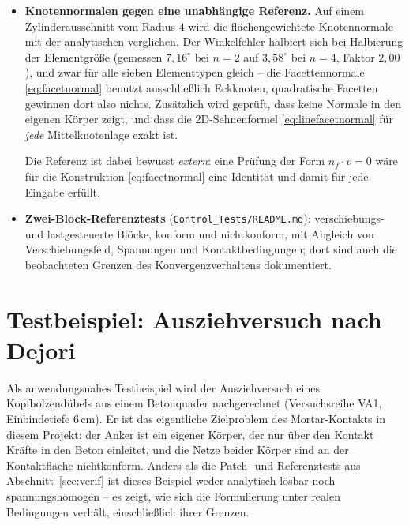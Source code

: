 \documentclass[a4paper,11pt]{article}
\def\bm#1{#1}%
\newcommand{\file}[1]{\texttt{\small #1}}
\let\stdsection\section
\renewcommand{\section}{\clearpage\stdsection}
\begin{document}
\begin{itemize}
  \item \textbf{Knotennormalen gegen eine unabhängige Referenz.} Auf einem Zylinderausschnitt
        vom Radius $4$ wird die flächengewichtete Knotennormale mit der analytischen verglichen.
        Der Winkelfehler halbiert sich bei Halbierung der Elementgröße (gemessen $7{,}16^\circ$
        bei $n=2$ auf $3{,}58^\circ$ bei $n=4$, Faktor $2{,}00$), und zwar für alle sieben
        Elementtypen gleich -- die Facettennormale \eqref{eq:facetnormal} benutzt ausschließlich
        Eckknoten, quadratische Facetten gewinnen dort also nichts. Zusätzlich wird geprüft, dass
        keine Normale in den eigenen Körper zeigt, und dass die 2D-Sehnenformel
        \eqref{eq:linefacetnormal} für \emph{jede} Mittelknotenlage exakt ist.

        Die Referenz ist dabei bewusst \emph{extern}: eine Prüfung der Form
        $\bm n_f\cdot\bm v=0$ wäre für die Konstruktion \eqref{eq:facetnormal} eine Identität und
        damit für jede Eingabe erfüllt.
  \item \textbf{Zwei-Block-Referenztests} (\file{Control\_Tests/README.md}): verschiebungs- und
        lastgesteuerte Blöcke, konform und nichtkonform, mit Abgleich von Verschiebungsfeld,
        Spannungen und Kontaktbedingungen; dort sind auch die beobachteten Grenzen des
        Konvergenzverhaltens dokumentiert.
\end{itemize}

\section{Testbeispiel: Ausziehversuch nach Dejori}
\label{sec:testbeispiel}

Als anwendungsnahes Testbeispiel wird der Ausziehversuch eines Kopfbolzendübels aus einem
Betonquader nachgerechnet (Versuchsreihe VA1, Einbindetiefe 6\,cm). Er ist das eigentliche
Zielproblem des Mortar-Kontakts in diesem Projekt: der Anker ist ein eigener Körper, der nur über
den Kontakt Kräfte in den Beton einleitet, und die Netze beider Körper sind an der Kontaktfläche
nichtkonform. Anders als die Patch- und Referenztests aus Abschnitt~\ref{sec:verif} ist dieses
Beispiel weder analytisch lösbar noch spannungshomogen -- es zeigt, wie sich die Formulierung
unter realen Bedingungen verhält, einschließlich ihrer Grenzen.
\end{document}
